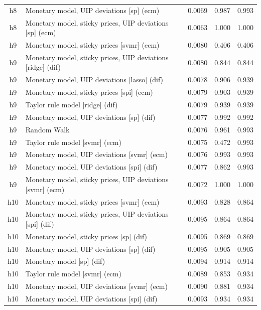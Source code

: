 \begin{ThreePartTable}
\begin{longtable}[t]{cp{5.5cm}ccc}
h8 & \raggedright Monetary model, UIP deviations [sp] (ecm) & 0.0069 & 0.987 & 0.993\\
h8 & \raggedright Monetary model, sticky prices, UIP deviations [sp] (ecm) & 0.0063 & 1.000 & 1.000\\
\addlinespace
h9 & \raggedright Monetary model, sticky prices [svmr] (ecm) & 0.0080 & 0.406 & 0.406\\
h9 & \raggedright Monetary model, sticky prices, UIP deviations [ridge] (dif) & 0.0080 & 0.844 & 0.844\\
h9 & \raggedright Monetary model, UIP deviations [lasso] (dif) & 0.0078 & 0.906 & 0.939\\
h9 & \raggedright Monetary model, sticky prices [spi] (ecm) & 0.0079 & 0.903 & 0.939\\
h9 & \raggedright Taylor rule model [ridge] (dif) & 0.0079 & 0.939 & 0.939\\
h9 & \raggedright Monetary model, UIP deviations [sp] (dif) & 0.0077 & 0.992 & 0.992\\
h9 & \raggedright Random Walk & 0.0076 & 0.961 & 0.993\\
h9 & \raggedright Taylor rule model [svmr] (ecm) & 0.0075 & 0.472 & 0.993\\
h9 & \raggedright Monetary model, UIP deviations [svmr] (ecm) & 0.0076 & 0.993 & 0.993\\
h9 & \raggedright Monetary model, UIP deviations [spi] (dif) & 0.0077 & 0.862 & 0.993\\
h9 & \raggedright Monetary model, sticky prices, UIP deviations [svmr] (ecm) & 0.0072 & 1.000 & 1.000\\
\addlinespace
h10 & \raggedright Monetary model, sticky prices [svmr] (ecm) & 0.0093 & 0.828 & 0.864\\
h10 & \raggedright Monetary model, sticky prices, UIP deviations [spi] (dif) & 0.0095 & 0.864 & 0.864\\
h10 & \raggedright Monetary model, sticky prices [sp] (dif) & 0.0095 & 0.869 & 0.869\\
h10 & \raggedright Monetary model, UIP deviations [sp] (dif) & 0.0095 & 0.905 & 0.905\\
h10 & \raggedright Monetary model [sp] (dif) & 0.0094 & 0.914 & 0.914\\
h10 & \raggedright Taylor rule model [svmr] (ecm) & 0.0089 & 0.853 & 0.934\\
h10 & \raggedright Monetary model, UIP deviations [svmr] (ecm) & 0.0090 & 0.881 & 0.934\\
h10 & \raggedright Monetary model, UIP deviations [spi] (dif) & 0.0093 & 0.934 & 0.934\\

\end{longtable}
\end{ThreePartTable}

